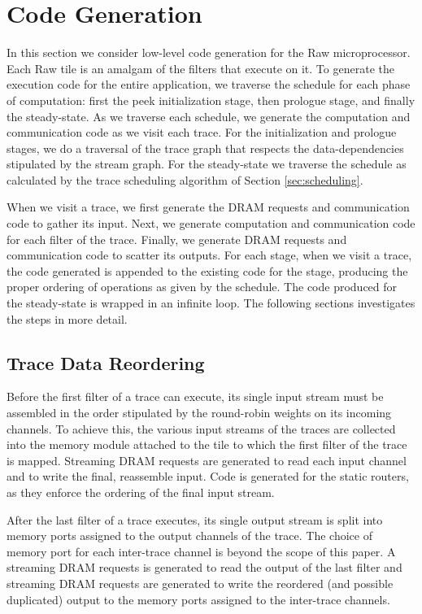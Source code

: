 \section{Code Generation}
\label{sec:codegen}
In this section we consider low-level code generation for the Raw
microprocessor. Each Raw tile is an amalgam of the filters that
execute on it. To generate the execution code for the entire
application, we traverse the schedule for each phase of computation:
first the peek initialization stage, then prologue stage, and finally
the steady-state.  As we traverse each schedule, we generate the
computation and communication code as we visit each trace.  For the
initialization and prologue stages, we do a traversal of the trace
graph that respects the data-dependencies stipulated by the stream
graph. For the steady-state we traverse the schedule as calculated by
the trace scheduling algorithm of Section \ref{sec:scheduling}.

When we visit a trace, we first generate the DRAM requests and
communication code to gather its input.  Next, we generate computation
and communication code for each filter of the trace.  Finally, we
generate DRAM requests and communication code to scatter its outputs.
For each stage, when we visit a trace, the code generated is appended
to the existing code for the stage, producing the proper ordering of
operations as given by the schedule.  The code produced for the
steady-state is wrapped in an infinite loop. The following sections
investigates the steps in more detail.

\subsection{Trace Data Reordering}
Before the first filter of a trace can execute, its single input
stream must be assembled in the order stipulated by the round-robin
weights on its incoming channels. To achieve this, the various input
streams of the traces are collected into the memory module attached to
the tile to which the first filter of the trace is mapped. Streaming
DRAM requests are generated to read each input channel and to write
the final, reassemble input.  Code is generated for the static
routers, as they enforce the ordering of the final input stream.

After the last filter of a trace executes, its single output stream is
split into memory ports assigned to the output channels of the trace.
The choice of memory port for each inter-trace channel is beyond the
scope of this paper. A streaming DRAM requests is generated to read
the output of the last filter and streaming DRAM requests are
generated to write the reordered (and possible duplicated) output to
the memory ports assigned to the inter-trace channels.

